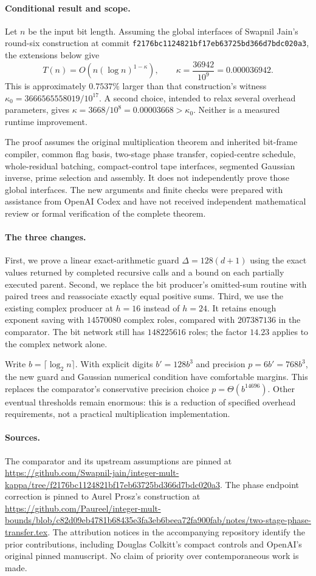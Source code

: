 \paragraph{Conditional result and scope.}
Let $n$ be the input bit length. Assuming the global interfaces of
Swapnil Jain's round-six construction at commit
\texttt{f2176bc1124821bf17eb63725bd366d7bdc020a3}, the extensions below give
\[
 T(n)=O\!\left(n(\log n)^{1-\kappa}\right),\qquad
 \boxed{\kappa=\frac{36942}{10^9}=0.000036942.}
\]
This is approximately $0.7537\%$ larger than that construction's witness
$\kappa_0=3666565558019/10^{17}$. A second choice, intended to relax several
overhead parameters, gives $\kappa=3668/10^8=0.00003668>\kappa_0$.
Neither is a measured runtime improvement.

The proof assumes the original multiplication theorem and inherited
bit-frame compiler, common flag basis, two-stage phase transfer, copied-centre
schedule, whole-residual batching, compact-control tape interfaces, segmented
Gaussian inverse, prime selection and assembly. It does not independently
prove those global interfaces. The new arguments and finite checks were
prepared with assistance from OpenAI Codex and have not received independent
mathematical review or formal verification of the complete theorem.

\paragraph{The three changes.}
First, we prove a linear exact-arithmetic guard
$\Delta=128(d+1)$ using the exact values returned by completed recursive calls
and a bound on each partially executed parent. Second, we replace the bit
producer's omitted-sum routine with paired trees and reassociate exactly equal
positive sums. Third, we use the existing complex producer at $h=16$ instead
of $h=24$. It retains enough exponent saving with $14570080$ complex roles,
compared with $207387136$ in the comparator. The bit network still has
$148225616$ roles; the factor $14.23$ applies to the complex network alone.

Write $b=\lceil\log_2n\rceil$. With explicit digits $b'=128b^3$ and precision
$p=6b'=768b^3$, the new guard and Gaussian numerical condition have comfortable
margins. This replaces the comparator's conservative precision choice
$p=\Theta(b^{14696})$. Other eventual thresholds remain enormous: this is a
reduction of specified overhead requirements, not a practical multiplication
implementation.

\paragraph{Sources.}
The comparator and its upstream assumptions are pinned at
\url{https://github.com/Swapnil-jain/integer-mult-kappa/tree/f2176bc1124821bf17eb63725bd366d7bdc020a3}.
The phase endpoint correction is pinned to Aurel Prosz's construction at
\url{https://github.com/Paureel/integer-mult-bounds/blob/c82d09eb4781b68435e3fa3eb6beea72fa900fab/notes/two-stage-phase-transfer.tex}.
The attribution notices in the accompanying repository identify the prior
contributions, including Douglas Colkitt's compact controls and OpenAI's
original pinned manuscript. No claim of priority over contemporaneous work
is made.
